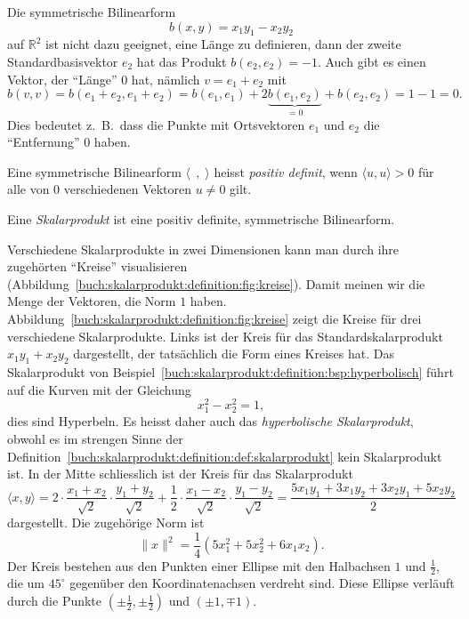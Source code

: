 \begin{beispiel}
\label{buch:skalarprodukt:definition:bsp:hyperbolisch}
Die symmetrische Bilinearform
\[
b(x,y)
=
x_1y_1-x_2y_2
\]
auf $\mathbb{R}^2$ ist nicht dazu geeignet, eine Länge zu definieren,
dann der zweite Standardbasisvektor $e_2$ hat das Produkt
$b(e_2,e_2) = -1$.
Auch gibt es einen Vektor, der ``Länge'' 0 hat,
nämlich $v=e_1+e_2$ mit
\[
b(v,v)
=
b(e_1+e_2,e_1+e_2)
=
b(e_1,e_1) + 2\underbrace{b(e_1,e_2)}_{\displaystyle =0} + b(e_2,e_2)
=
1-1
=
0.
\]
Dies bedeutet z.~B.~dass die Punkte mit Ortsvektoren $e_1$ und $e_2$ die
``Entfernung'' $0$ haben.
\end{beispiel}

\begin{definition}
Eine symmetrische Bilinearform $\langle\;\,,\;\rangle$
heisst {\em positiv definit}, wenn $\langle u,u\rangle > 0$ 
%
für alle von 0 verschiedenen Vektoren $u\ne 0$ gilt.
\end{definition}

\begin{definition}[Skalarprodukt]
\label{buch:skalarprodukt:definition:def:skalarprodukt}
Eine {\em Skalarprodukt} ist eine positiv definite, symmetrische Bilinearform.
%
\end{definition}

%

Verschiedene Skalarprodukte in zwei Dimensionen kann man durch ihre
zugehörten ``Kreise'' visualisieren
%
(Abbildung~\ref{buch:skalarprodukt:definition:fig:kreise}).
Damit meinen wir die Menge der Vektoren, die Norm $1$ haben.
Abbildung~\ref{buch:skalarprodukt:definition:fig:kreise} zeigt
die Kreise für drei verschiedene Skalarprodukte.
Links ist der Kreis für das Standard\-skalarprodukt $x_1y_1+x_2y_2$
dargestellt, der tatsächlich die Form eines Kreises hat.
Das Skalarprodukt von
Beispiel~\ref{buch:skalarprodukt:definition:bsp:hyperbolisch}
führt auf die Kurven mit der Gleichung
\[
x_1^2-x_2^2=1,
\]
dies sind Hyperbeln.
Es heisst daher auch das {\em hyperbolische Skalarprodukt}, obwohl es
%
%
im strengen Sinne der
Definition~\ref{buch:skalarprodukt:definition:def:skalarprodukt}
kein Skalarprodukt ist.
In der Mitte schliesslich ist der Kreis für das Skalarprodukt 
\[
\langle x,y\rangle
=
2
\cdot
\frac{x_1+x_2}{\!\sqrt{2}}
\cdot
\frac{y_1+y_2}{\!\sqrt{2}}
+
\frac12
\cdot
\frac{x_1-x_2}{\!\sqrt{2}}
\cdot
\frac{y_1-y_2}{\!\sqrt{2}}
=
\frac{5x_1y_1 + 3x_1y_2 + 3x_2y_1 + 5x_2y_2}{2}
\]
dargestellt.
Die zugehörige Norm ist
\[
\|x\|^2
=
\frac14(
5x_1^2 + 5x_2^2 + 6x_1x_2).
\]
Der Kreis bestehen aus den Punkten einer Ellipse mit den Halbachsen
$1$ und $\frac12$, die um $45^\circ$ gegenüber den Koordinatenachsen
verdreht sind.
Diese Ellipse verläuft durch die Punkte $(\pm\frac12,\pm\frac12)$ und
$(\pm1,\mp1)$.

